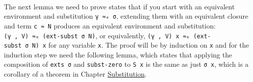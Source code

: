 \begin{fence}
\begin{code}%
\>[0]\AgdaSpace{}%
\AgdaSymbol{:}\AgdaSpace{}%
\AgdaSpace{}%
\AgdaSymbol{\}}\AgdaSpace{}%
\AgdaSpace{}%
\AgdaSpace{}%
\AgdaSpace{}%
\AgdaSpace{}%
\AgdaSpace{}%
\AgdaSpace{}%
\AgdaSpace{}%
\AgdaSpace{}%
\AgdaSpace{}%
\AgdaSpace{}%
\AgdaSymbol{(}\AgdaSpace{}%
\AgdaOperator{\AgdaInductiveConstructor{,}}\AgdaSpace{}%
\AgdaSymbol{)}\AgdaSpace{}%
\<%
\\
\>[0]\AgdaSymbol{\{}\AgdaSymbol{\}\{}\AgdaSymbol{\}}\AgdaSpace{}%
\AgdaSpace{}%
\AgdaSpace{}%
\AgdaSymbol{\{}\AgdaSymbol{\}}\AgdaSpace{}%
\AgdaSymbol{=}\AgdaSpace{}%
\AgdaSpace{}%
\AgdaSymbol{(}\AgdaSpace{}%
\AgdaSymbol{)}\AgdaSpace{}%
\AgdaSpace{}%
\AgdaSpace{}%
\<%
\end{code}
\end{fence}

The next lemma we need to prove states that if you start with an
equivalent environment and substitution \texttt{γ\ ≈ₑ\ σ}, extending
them with an equivalent closure and term \texttt{c\ ≈\ N} produces an
equivalent environment and substitution:
\texttt{(γ\ ,\textquotesingle{}\ V)\ ≈ₑ\ (ext-subst\ σ\ N)}, or
equivalently,
\texttt{(γ\ ,\textquotesingle{}\ V)\ x\ ≈ₑ\ (ext-subst\ σ\ N)\ x} for
any variable \texttt{x}. The proof will be by induction on \texttt{x}
and for the induction step we need the following lemma, which states
that applying the composition of \texttt{exts\ σ} and
\texttt{subst-zero} to \texttt{S\ x} is the same as just \texttt{σ\ x},
which is a corollary of a theorem in Chapter
\protect\hyperlink{Substitution}{Substitution}.

